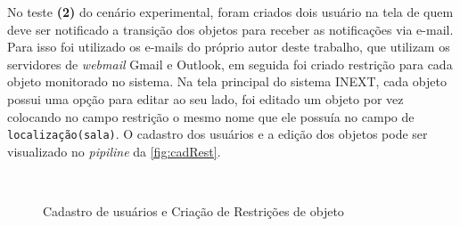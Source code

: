 No teste \textbf{(2)} do cenário experimental, foram criados dois usuário na tela de quem deve ser notificado a transição dos objetos para receber as notificações via e-mail. Para isso foi utilizado os e-mails do próprio autor deste trabalho, que utilizam os servidores de \textit{webmail} Gmail e Outlook, em seguida foi criado restrição para cada objeto monitorado no sistema. Na tela principal do sistema INEXT, cada objeto possui uma opção para editar ao seu lado, foi editado um objeto por vez colocando no campo restrição o mesmo nome que ele possuía no campo de \texttt{localização(sala)}. O cadastro dos usuários e a edição dos objetos pode ser visualizado no \textit{pipiline} da \autoref{fig:cadRest}.

\newpage

\begin{figure}[ht]
        \centering\caption{Cadastro de usuários e Criação de Restrições de objeto}
        \label{fig:cadRest}
             \hspace{0.5cm}
             \\
              \hspace{0.5cm}
\end{figure}

